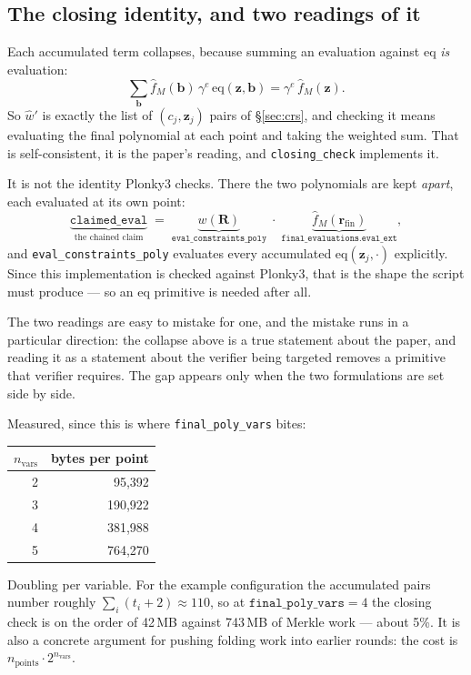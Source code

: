 \documentclass[11pt,a4paper]{article}
\newcommand{\eqp}{\mathrm{eq}}
\begin{document}
\subsection*{The closing identity, and two readings of it}
Each accumulated term collapses, because summing an evaluation against $\eqp$ \emph{is} evaluation:
\[
  \sum_{\boldsymbol b} \hat f_{M}(\boldsymbol b)\,\gamma^{e}\,\eqp(\boldsymbol z,\boldsymbol b)
  = \gamma^{e}\,\hat f_{M}(\boldsymbol z).
\]
So $\hat w'$ is exactly the list of $(c_{j},\boldsymbol z_{j})$ pairs of \S\ref{sec:crs}, and checking it means
evaluating the final polynomial at each point and taking the weighted sum. That is self-consistent,
it is the paper's reading, and \texttt{closing\_check} implements it.

It is not the identity Plonky3 checks. There the two polynomials are kept \emph{apart}, each
evaluated at its own point:
\[
  \underbrace{\texttt{claimed\_eval}}_{\text{the chained claim}}
  \;=\;
  \underbrace{w(\boldsymbol R)}_{\texttt{eval\_constraints\_poly}}
  \;\cdot\;
  \underbrace{\hat f_{M}(\boldsymbol r_{\mathrm{fin}})}_{\texttt{final\_evaluations.eval\_ext}},
\]
and \texttt{eval\_constraints\_poly} evaluates every accumulated $\eqp(\boldsymbol z_{j},\cdot)$
explicitly. Since this implementation is checked against Plonky3, that is the shape the script must
produce --- so an $\eqp$ primitive is needed after all.

The two readings are easy to mistake for one, and the mistake runs in a particular direction: the
collapse above is a true statement about the paper, and reading it as a statement about the verifier
being targeted removes a primitive that verifier requires. The gap appears only when the two
formulations are set side by side.

Measured, since this is where \texttt{final\_poly\_vars} bites:

\begin{center}\small
\begin{tabular}{@{}rr@{}}
\toprule
$n_{\mathrm{vars}}$ & bytes per point\\
\midrule
2 & 95{,}392\\
3 & 190{,}922\\
4 & 381{,}988\\
5 & 764{,}270\\
\bottomrule
\end{tabular}
\end{center}

Doubling per variable. For the example configuration the accumulated pairs number roughly
$\sum_i (t_i+2)\approx110$, so at $\texttt{final\_poly\_vars}=4$ the closing check is on the order of
42\,MB against 743\,MB of Merkle work --- about 5\%. It is also a concrete argument for pushing
folding work into earlier rounds: the cost is $n_{\mathrm{points}}\cdot2^{n_{\mathrm{vars}}}$.
\end{document}
